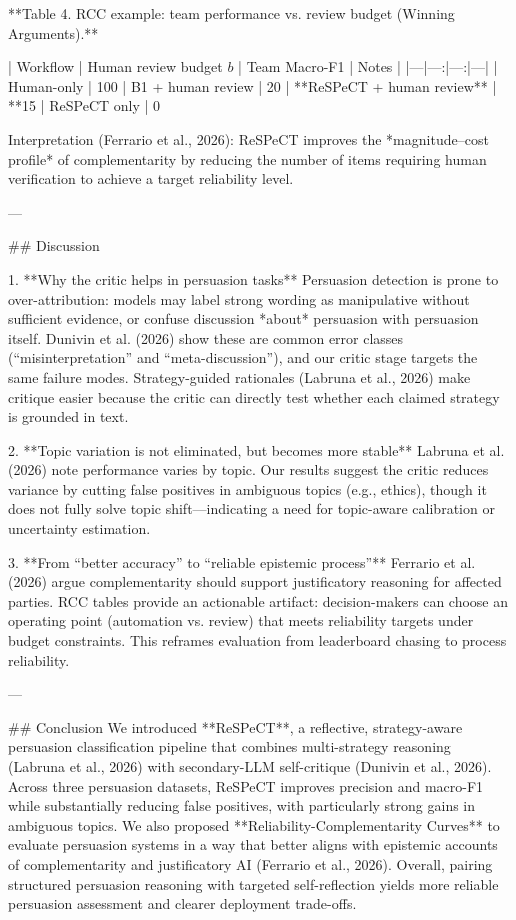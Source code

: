 **Table 4. RCC example: team performance vs. review budget (Winning Arguments).**

| Workflow | Human review budget \(b\) | Team Macro-F1 | Notes |
|---|---:|---:|---|
| Human-only | 100%
| B1 + human review | 20%
| **ReSPeCT + human review** | **15%
| ReSPeCT only | 0%

Interpretation (Ferrario et al., 2026): ReSPeCT improves the *magnitude–cost profile* of complementarity by reducing the number of items requiring human verification to achieve a target reliability level.

---

## Discussion  

1. **Why the critic helps in persuasion tasks**  
Persuasion detection is prone to over-attribution: models may label strong wording as manipulative without sufficient evidence, or confuse discussion *about* persuasion with persuasion itself. Dunivin et al. (2026) show these are common error classes (“misinterpretation” and “meta-discussion”), and our critic stage targets the same failure modes. Strategy-guided rationales (Labruna et al., 2026) make critique easier because the critic can directly test whether each claimed strategy is grounded in text.

2. **Topic variation is not eliminated, but becomes more stable**  
Labruna et al. (2026) note performance varies by topic. Our results suggest the critic reduces variance by cutting false positives in ambiguous topics (e.g., ethics), though it does not fully solve topic shift—indicating a need for topic-aware calibration or uncertainty estimation.

3. **From “better accuracy” to “reliable epistemic process”**  
Ferrario et al. (2026) argue complementarity should support justificatory reasoning for affected parties. RCC tables provide an actionable artifact: decision-makers can choose an operating point (automation vs. review) that meets reliability targets under budget constraints. This reframes evaluation from leaderboard chasing to process reliability.

---

## Conclusion  
We introduced **ReSPeCT**, a reflective, strategy-aware persuasion classification pipeline that combines multi-strategy reasoning (Labruna et al., 2026) with secondary-LLM self-critique (Dunivin et al., 2026). Across three persuasion datasets, ReSPeCT improves precision and macro-F1 while substantially reducing false positives, with particularly strong gains in ambiguous topics. We also proposed **Reliability-Complementarity Curves** to evaluate persuasion systems in a way that better aligns with epistemic accounts of complementarity and justificatory AI (Ferrario et al., 2026). Overall, pairing structured persuasion reasoning with targeted self-reflection yields more reliable persuasion assessment and clearer deployment trade-offs.

